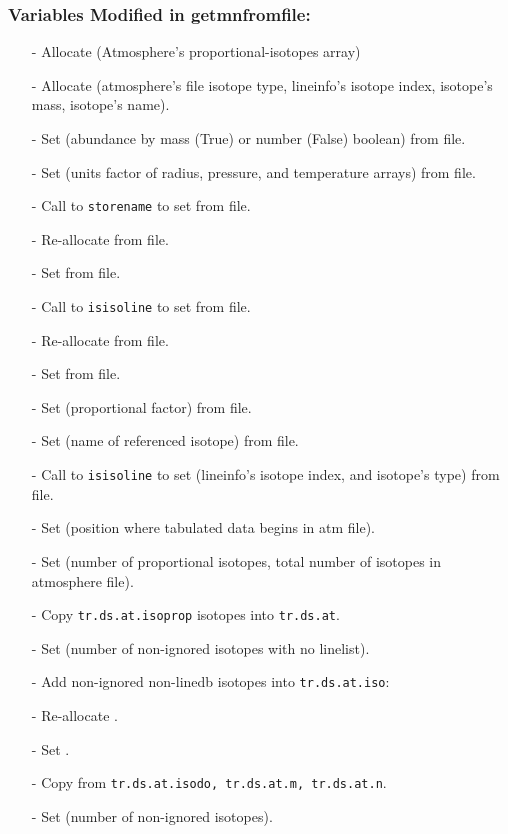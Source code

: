 \documentclass[letterpaper,12pt]{article}
\begin{document}
\subsubsection{Variables Modified in getmnfromfile:}
\begin{enumerate}[leftmargin=10pt, noitemsep, parsep=0pt, topsep=0ex]
\item[-] Allocate  (Atmosphere's
  proportional-isotopes array)
\item[-] Allocate  (atmosphere's file isotope type, lineinfo's isotope
  index, isotope's mass, isotope's name).
\item[-] Set  (abundance by mass (True) or number
  (False) boolean) from file.
\item[-] Set  (units factor of radius, pressure, and
  temperature arrays) from file.
\item[-] Call to {\tt storename} to set  from
  file.
\item[-] Re-allocate  from file.
\item[-] Set  from file.
\item[-] Call to {\tt isisoline} to set  from file.
\item[-] Re-allocate  from file.
\item[-] Set  from file.
\item[-] Set  (proportional factor) from
  file.
\item[-] Set  (name of referenced isotope)
  from file.
\item[-] Call to {\tt isisoline} to set  (lineinfo's isotope index, and isotope's
  type) from file.
\item[-] Set  (position where tabulated
  data begins in atm file).
\item[-] Set  (number of
  proportional isotopes, total number of isotopes in atmosphere file).
\item[-] Copy {\tt tr.ds.at.isoprop} isotopes into {\tt tr.ds.at}.
\item[-] Set  (number of non-ignored
  isotopes with no linelist).
\item[-] Add non-ignored non-linedb isotopes into {\tt tr.ds.at.iso}:
\item[-] Re-allocate 
  .
\item[-] Set .
\item[-] Copy  from {\tt tr.ds.at.isodo, tr.ds.at.m,
    tr.ds.at.n}.
\item[-] Set  (number of non-ignored isotopes).
\end{enumerate}
\end{document}
